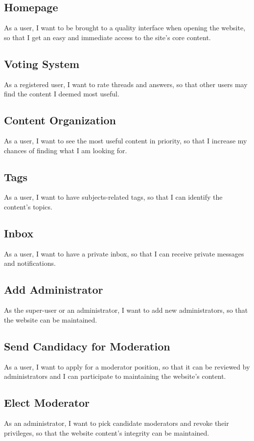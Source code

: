 \documentclass [a4paper, 11pt]{article}
\begin{document}
\subsection{Homepage}
As a user, I want to be brought to a quality interface when opening the website, so that I get an easy and immediate access to the site's core content.

\subsection{Voting System}
As a registered user, I want to rate threads and answers, so that other users may find the content I deemed most useful.

\subsection{Content Organization}
As a user, I want to see the most useful content in priority, so that I increase my chances of finding what I am looking for.

\subsection{Tags}
As a user, I want to have subjects-related tags, so that I can identify the content's topics.

\subsection{Inbox}
As a user, I want to have a private inbox, so that I can receive private messages and notifications.

\subsection{Add Administrator}
As the super-user or an administrator, I want to add new administrators, so that the website can be maintained.

\subsection{Send Candidacy for Moderation}
As a user, I want to apply for a moderator position, so that it can be reviewed by administrators and I can participate to maintaining the website's content.

\subsection{Elect Moderator}
As an administrator, I want to pick candidate moderators and revoke their privileges, so that the website content's integrity can be maintained.
\end{document}
